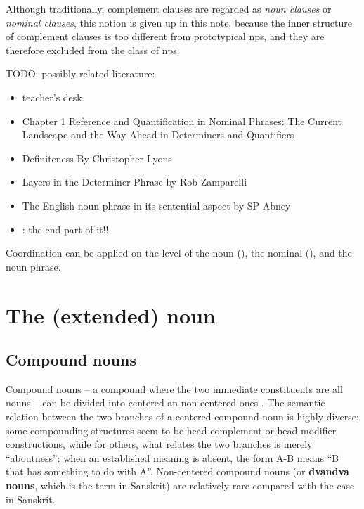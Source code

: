 \documentclass[UTF8, a4paper, oneside, scheme=plain, 12pt]{ctexbook}
\newcommand*{\citepages}[1]{pp.~{#1}}
\newcommand*{\concept}[1]{\textbf{#1}}
\newcommand*{\term}[1]{\emph{#1}}
\begin{document}
Although traditionally, complement clauses are regarded as \term{noun clauses}
or \term{nominal clauses},
this notion is given up in this note,
because the inner structure of complement clauses is too different from prototypical \acs{np}s,
and they are therefore excluded from the class of \acs{np}s.

TODO: possibly related literature: 
\begin{itemize}
    \item teacher's desk
    \item Chapter 1 Reference and Quantification in Nominal Phrases: The Current Landscape and the Way Ahead in Determiners and Quantifiers
    \item Definiteness By Christopher Lyons
    \item Layers in the Determiner Phrase by Rob Zamparelli
    \item The English noun phrase in its sentential aspect by SP Abney
    \item \citet{laenzlinger2017view}: the end part of it!!
\end{itemize}

Coordination can be applied on the level of the noun
(), 
the nominal (), 
and the noun phrase. 


\section{The (extended) noun}\label{sec:np.head}

\subsection{Compound nouns}\label{sec:pos.noun.compound}

Compound nouns -- a compound where the two immediate constituents are all nouns -- 
can be divided into centered an non-centered ones
\citep[\citepages{1646-1648}]{cgel}.
The semantic relation between the two branches of a centered compound noun
is highly diverse; 
some compounding structures seem to be head-complement or head-modifier constructions,
while for others, what relates the two branches is merely ``aboutness'':
when an established meaning is absent,
the form A-B means ``B that has something to do with A''.
Non-centered compound nouns 
(or \concept{dvandva nouns}, which is the term in Sanskrit) 
are relatively rare
compared with the case in Sanskrit.
\end{document}
